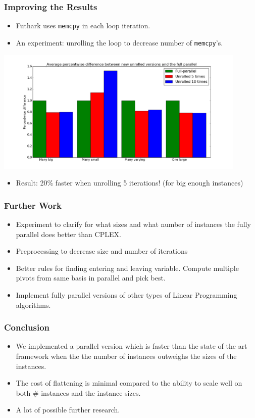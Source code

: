 \documentclass{beamer}
\renewcommand{\emph}[1]{\textcolor{structure}{#1}}
\begin{document}
\begin{frame}[fragile]
\frametitle{Improving the Results}

\begin{itemize}
\item Futhark uses \texttt{memcpy} in each loop iteration.

\item \emph{An experiment}: unrolling the loop to decrease number of \texttt{memcpy}'s.
\end{itemize}
\pause
\centering
\includegraphics[width=0.9\textwidth]{../Doc/figures/unrolling}

\begin{itemize}
\item \emph{Result}: 20\% faster when unrolling 5 iterations! {\tiny(for big enough instances)}
\end{itemize}
\end{frame}



\begin{frame}
\frametitle{Further Work}
\begin{itemize}
	\item Experiment to clarify for what sizes and what number of instances the fully parallel does better than CPLEX.
	\item Preprocessing to decrease size and number of iterations
	\item Better rules for finding entering and leaving variable. Compute multiple pivots from same basis in parallel and pick best.
	\item Implement fully parallel versions of other types of Linear Programming algorithms.
\end{itemize}
\end{frame}

\begin{frame}
\frametitle{Conclusion}
\begin{itemize}
	\item We implemented a parallel version which is faster than the state of the art framework when the the number of instances outweighs the sizes of the instances.
	\item The cost of flattening is minimal compared to the ability to scale well on both \# instances and the instance sizes.
	\item A lot of possible further research.
\end{itemize}
\end{frame}
\end{document}

